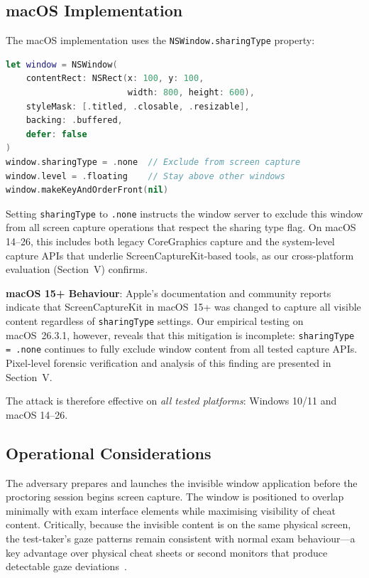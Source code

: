 \documentclass[conference]{IEEEtran}
\begin{document}
\subsection{macOS Implementation}

The macOS implementation uses the \texttt{NSWindow.sharingType} property:

\begin{lstlisting}[language=Swift,caption={macOS display affinity exclusion via \texttt{NSWindow.sharingType}.},label={lst:macos}]
let window = NSWindow(
    contentRect: NSRect(x: 100, y: 100,
                        width: 800, height: 600),
    styleMask: [.titled, .closable, .resizable],
    backing: .buffered,
    defer: false
)
window.sharingType = .none  // Exclude from screen capture
window.level = .floating    // Stay above other windows
window.makeKeyAndOrderFront(nil)
\end{lstlisting}

Setting \texttt{sharingType} to \texttt{.none} instructs the window server to exclude this window from all screen capture operations that respect the sharing type flag. On macOS 14--26, this includes both legacy CoreGraphics capture and the system-level capture APIs that underlie ScreenCaptureKit-based tools, as our cross-platform evaluation (Section~V) confirms.

\textbf{macOS 15+ Behaviour}: Apple's documentation and community reports~\cite{columbusux2025screencapturekit} indicate that ScreenCaptureKit in macOS~15+ was changed to capture all visible content regardless of \texttt{sharingType} settings. Our empirical testing on macOS~26.3.1, however, reveals that this mitigation is incomplete: \texttt{sharingType = .none} continues to fully exclude window content from all tested capture APIs. Pixel-level forensic verification and analysis of this finding are presented in Section~V.

The attack is therefore effective on \textit{all tested platforms}: Windows 10/11 and macOS 14--26.

\subsection{Operational Considerations}

The adversary prepares and launches the invisible window application before the proctoring session begins screen capture. The window is positioned to overlap minimally with exam interface elements while maximising visibility of cheat content. Critically, because the invisible content is on the same physical screen, the test-taker's gaze patterns remain consistent with normal exam behaviour---a key advantage over physical cheat sheets or second monitors that produce detectable gaze deviations~\cite{kaddoura2023computational,ferdosi2023modeling}.
\end{document}
